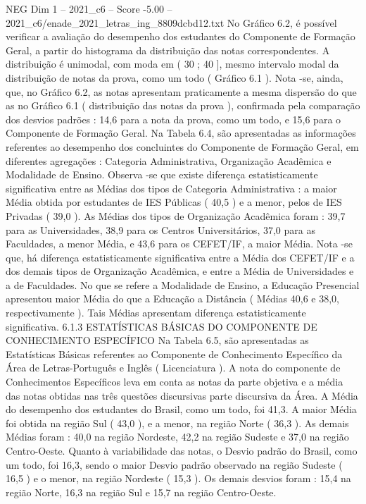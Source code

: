 \begin{textsample}{NEG Dim 1 – 2021\_c6 – Score -5.00 – 2021\_c6/enade\_2021\_letras\_ing\_8809dcbd12.txt}
No Gráfico 6.2, é possível verificar a avaliação do desempenho dos estudantes do Componente de Formação Geral, a partir do histograma da distribuição das notas correspondentes.
A distribuição é unimodal, com moda em ( 30 ; 40 ], mesmo intervalo modal da distribuição de notas da prova, como um todo ( Gráfico 6.1 ).
Nota -se, ainda, que, no Gráfico 6.2, as notas apresentam praticamente a mesma dispersão do que as no Gráfico 6.1 ( distribuição das notas da prova ), confirmada pela comparação dos desvios padrões : 14,6 para a nota da prova, como um todo, e 15,6 para o Componente de Formação Geral.
Na Tabela 6.4, são apresentadas as informações referentes ao desempenho dos concluintes do Componente de Formação Geral, em diferentes agregações : Categoria Administrativa, Organização Acadêmica e Modalidade de Ensino.
Observa -se que existe diferença estatisticamente significativa entre as Médias dos tipos de Categoria Administrativa : a maior Média obtida por estudantes de IES Públicas ( 40,5 ) e a menor, pelos de IES Privadas ( 39,0 ).
As Médias dos tipos de Organização Acadêmica foram : 39,7 para as Universidades, 38,9 para os Centros Universitários, 37,0 para as Faculdades, a menor Média, e 43,6 para os CEFET/IF, a maior Média.
Nota -se que, há diferença estatisticamente significativa entre a Média dos CEFET/IF e a dos demais tipos de Organização Acadêmica, e entre a Média de Universidades e a de Faculdades.
No que se refere a Modalidade de Ensino, a Educação Presencial apresentou maior Média do que a Educação a Distância ( Médias 40,6 e 38,0, respectivamente ).
Tais Médias apresentam diferença estatisticamente significativa. 6.1.3 ESTATÍSTICAS BÁSICAS DO COMPONENTE DE CONHECIMENTO ESPECÍFICO Na Tabela 6.5, são apresentadas as Estatísticas Básicas referentes ao Componente de Conhecimento Específico da Área de Letras-Português e Inglês ( Licenciatura ).
A nota do componente de Conhecimentos Específicos leva em conta as notas da parte objetiva e a média das notas obtidas nas três questões discursivas parte discursiva da Área.
A Média do desempenho dos estudantes do Brasil, como um todo, foi 41,3.
A maior Média foi obtida na região Sul ( 43,0 ), e a menor, na região Norte ( 36,3 ).
As demais Médias foram : 40,0 na região Nordeste, 42,2 na região Sudeste e 37,0 na região Centro-Oeste.
Quanto à variabilidade das notas, o Desvio padrão do Brasil, como um todo, foi 16,3, sendo o maior Desvio padrão observado na região Sudeste ( 16,5 ) e o menor, na região Nordeste ( 15,3 ).
Os demais desvios foram : 15,4 na região Norte, 16,3 na região Sul e 15,7 na região Centro-Oeste.

\end{textsample}
